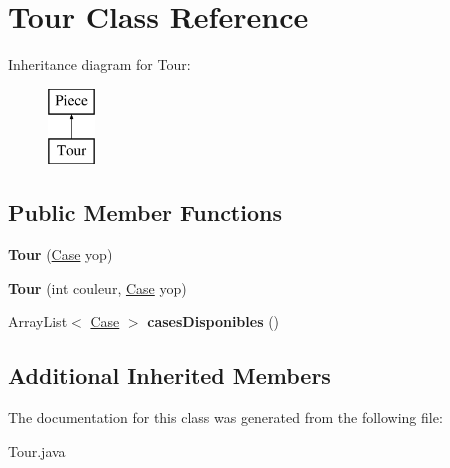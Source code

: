 \hypertarget{class_tour}{}\section{Tour Class Reference}
\label{class_tour}
Inheritance diagram for Tour\+:\begin{figure}[H]
\begin{center}
\leavevmode
\includegraphics[height=2.000000cm]{class_tour}
\end{center}
\end{figure}
\subsection*{Public Member Functions}
\begin{DoxyCompactItemize}
\item 
{\bfseries Tour} (\hyperlink{class_case}{Case} yop)\hypertarget{class_tour_a20b303a63664f8008ead5f3ce8d6f3ac}{}\label{class_tour_a20b303a63664f8008ead5f3ce8d6f3ac}

\item 
{\bfseries Tour} (int couleur, \hyperlink{class_case}{Case} yop)\hypertarget{class_tour_ab9a41edead37945a65025a00c4d340c4}{}\label{class_tour_ab9a41edead37945a65025a00c4d340c4}

\item 
Array\+List$<$ \hyperlink{class_case}{Case} $>$ {\bfseries cases\+Disponibles} ()\hypertarget{class_tour_a0c6771d950e1432656730e34475cb855}{}\label{class_tour_a0c6771d950e1432656730e34475cb855}

\end{DoxyCompactItemize}
\subsection*{Additional Inherited Members}


The documentation for this class was generated from the following file\+:\begin{DoxyCompactItemize}
\item 
Tour.\+java\end{DoxyCompactItemize}
